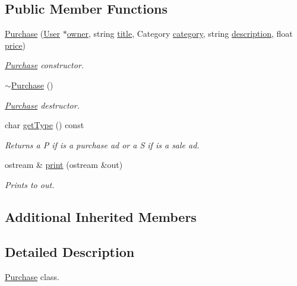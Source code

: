 \subsection*{Public Member Functions}
\begin{DoxyCompactItemize}
\item 
\hyperlink{class_purchase_ab7f299a547a1762433273500bc4085cf}{Purchase} (\hyperlink{class_user}{User} $\ast$\hyperlink{class_advertisement_a10398131c5aadcd1fdf08d6acabec45f}{owner}, string \hyperlink{class_advertisement_a63b197da6f91139ed6baf700f834a3db}{title}, Category \hyperlink{class_advertisement_af77599e289974c0e4f502db621257fe5}{category}, string \hyperlink{class_advertisement_afb0909f9fceabb44804e06e721ff7fee}{description}, float \hyperlink{class_advertisement_aefd1dddaabd0cfa411e6cbaaf67c4dd5}{price})
\begin{DoxyCompactList}\small\item\em \hyperlink{class_purchase}{Purchase} constructor. \end{DoxyCompactList}\item 
\hypertarget{class_purchase_a8ebd6efb2177df6d10fcba514095915f}{}\hyperlink{class_purchase_a8ebd6efb2177df6d10fcba514095915f}{$\sim$\+Purchase} ()\label{class_purchase_a8ebd6efb2177df6d10fcba514095915f}

\begin{DoxyCompactList}\small\item\em \hyperlink{class_purchase}{Purchase} destructor. \end{DoxyCompactList}\item 
char \hyperlink{class_purchase_aacd849fc1ec2b96e7c59de4012b8e45a}{get\+Type} () const 
\begin{DoxyCompactList}\small\item\em Returns a P if is a purchase ad or a S if is a sale ad. \end{DoxyCompactList}\item 
ostream \& \hyperlink{class_purchase_ad9c91fe1eadbb43884d5e95fb9607b08}{print} (ostream \&out)
\begin{DoxyCompactList}\small\item\em Prints to out. \end{DoxyCompactList}\end{DoxyCompactItemize}
\subsection*{Additional Inherited Members}


\subsection{Detailed Description}
\hyperlink{class_purchase}{Purchase} class. 

